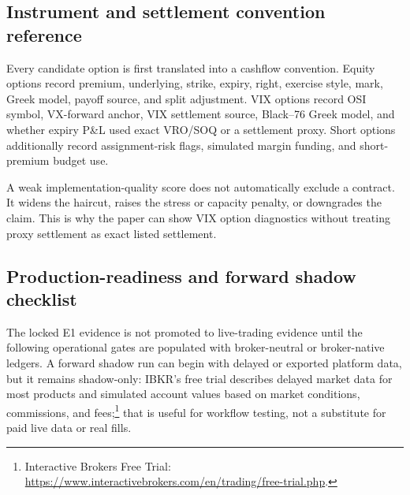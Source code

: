 \subsection{Instrument and settlement convention reference}

Every candidate option is first translated into a cashflow convention. Equity options record
premium, underlying, strike, expiry, right, exercise style, mark, Greek model, payoff source,
and split adjustment. VIX options record OSI symbol, VX-forward anchor, VIX settlement
source, Black--76 Greek model, and whether expiry P\&L used exact VRO/SOQ or a settlement
proxy. Short options additionally record assignment-risk flags, simulated margin funding,
and short-premium budget use.

A weak implementation-quality score does not automatically exclude a contract. It widens
the haircut, raises the stress or capacity penalty, or downgrades the claim. This is why the
paper can show VIX option diagnostics without treating proxy settlement as exact listed
settlement.

\subsection{Production-readiness and forward shadow checklist}

The locked E1 evidence is not promoted to live-trading evidence until the following
operational gates are populated with broker-neutral or broker-native ledgers. A forward
shadow run can begin with delayed or exported platform data, but it remains shadow-only:
IBKR's free trial describes delayed market data for most products and simulated account
values based on market conditions, commissions, and fees;\footnote{Interactive Brokers
Free Trial: \url{https://www.interactivebrokers.com/en/trading/free-trial.php}.} that is
useful for workflow testing, not a substitute for paid live data or real fills.

